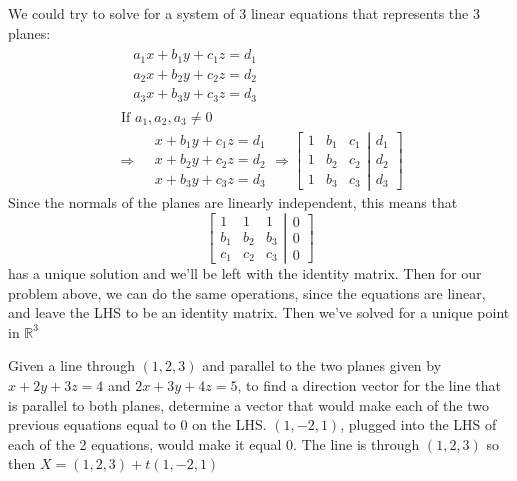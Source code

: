 \documentclass[twoside]{amsart}
\theoremstyle{plain}
\theoremstyle{definition}
\newcommand{\exercisehead}[1]
  {\smallskip
   \noindent{\small\bf Exercise #1.}}
\begin{document}
\exercisehead{16} We could try to solve for a system of 3 linear equations that represents the 3 planes:
\[
\begin{gathered}
  \begin{aligned}
    & a_1 x + b_1 y + c_1 z = d_1 \\
    & a_2 x + b_2 y + c_2 z = d_2 \\
    & a_3 x + b_3 y + c_3 z = d_3
  \end{aligned} \\
  \text{ If } a_1, a_2, a_3 \neq 0 \\
  \Longrightarrow   \begin{aligned}
    &  x + b_1 y + c_1 z = d_1 \\
    &  x + b_2 y + c_2 z = d_2 \\
    &  x + b_3 y + c_3 z = d_3
  \end{aligned} \Longrightarrow \left[ \begin{matrix}
      1 & b_1 & c_1 \\
      1 & b_2 & c_2 \\
      1 & b_3 & c_3 
\end{matrix} \right. \left| \begin{matrix} d_1 \\ d_2 \\ d_3 \end{matrix} \right]
\end{gathered}
\]
Since the normals of the planes are linearly independent, this means that 
\[
\left[ \begin{matrix}
    1 & 1 & 1 \\
    b_1 & b_2 & b_3 \\
    c_1 & c_2 & c_3 
\end{matrix} \right. \left| \begin{matrix} 0 \\ 0 \\ 0 \end{matrix} \right]
\]
has a unique solution and we'll be left with the identity matrix.  Then for our problem above, we can do the same operations, since the equations are linear, and leave the LHS to be an identity matrix.  Then we've solved for a unique point in $\mathbb{R}^3$

\exercisehead{17} Given a line through $(1,2,3)$ and parallel to the two planes given by $x + 2y + 3z=4$ and $2x + 3y + 4z =5$, to find a direction vector for the line that is parallel to both planes, determine a vector that would make each of the two previous equations equal to $0$ on the LHS.  $(1,-2,1)$, plugged into the LHS of each of the 2 equations, would make it equal $0$.  The line is through $(1,2,3)$ so then $\boxed{ X = (1,2,3) + t (1,-2,1) }$
\end{document}

